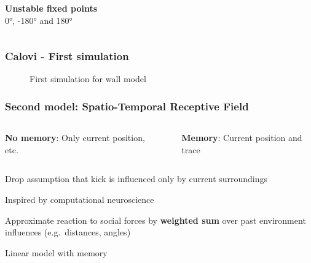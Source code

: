 \documentclass{beamer}
\begin{document}
\begin{frame}
{\begin{columns}
\begin{column}{0.5\textwidth}
\textbf{Unstable fixed points}\\\ang{0}, \ang{-180} and \ang{180}  
   \end{column}
   
 \end{columns}
} 

\end{frame}

\begin{frame}
  \frametitle{Calovi - First simulation}
\begin{figure}[H]
    \centering
    \caption*{First simulation for wall model}
    \label{fig:calovi-sim}
\end{figure}
\end{frame}

\begin{frame}
  \frametitle{Second model: Spatio-Temporal Receptive Field}
 \begin{columns}
   \begin{column}{0.5\textwidth}

 \textbf{No memory}: Only current position, etc.
\end{column}~\begin{column}{0.5\textwidth}

 \textbf{Memory}: Current position and trace
   \end{column}
 \end{columns}
  Drop assumption that kick is influenced only by current surroundings

  Inspired by computational neuroscience

  Approximate reaction to social forces by \textbf{weighted sum} over past environment influences (e.g.\ distances, angles)

  Linear model with memory
\end{frame}
\end{document}
